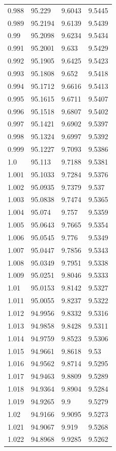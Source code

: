 \begin{tabular}{llll}
0.988 & 95.229 & 9.6043 & 9.5445 \\
0.989 & 95.2194 & 9.6139 & 9.5439 \\
0.99 & 95.2098 & 9.6234 & 9.5434 \\
0.991 & 95.2001 & 9.633 & 9.5429 \\
0.992 & 95.1905 & 9.6425 & 9.5423 \\
0.993 & 95.1808 & 9.652 & 9.5418 \\
0.994 & 95.1712 & 9.6616 & 9.5413 \\
0.995 & 95.1615 & 9.6711 & 9.5407 \\
0.996 & 95.1518 & 9.6807 & 9.5402 \\
0.997 & 95.1421 & 9.6902 & 9.5397 \\
0.998 & 95.1324 & 9.6997 & 9.5392 \\
0.999 & 95.1227 & 9.7093 & 9.5386 \\
1.0 & 95.113 & 9.7188 & 9.5381 \\
1.001 & 95.1033 & 9.7284 & 9.5376 \\
1.002 & 95.0935 & 9.7379 & 9.537 \\
1.003 & 95.0838 & 9.7474 & 9.5365 \\
1.004 & 95.074 & 9.757 & 9.5359 \\
1.005 & 95.0643 & 9.7665 & 9.5354 \\
1.006 & 95.0545 & 9.776 & 9.5349 \\
1.007 & 95.0447 & 9.7856 & 9.5343 \\
1.008 & 95.0349 & 9.7951 & 9.5338 \\
1.009 & 95.0251 & 9.8046 & 9.5333 \\
1.01 & 95.0153 & 9.8142 & 9.5327 \\
1.011 & 95.0055 & 9.8237 & 9.5322 \\
1.012 & 94.9956 & 9.8332 & 9.5316 \\
1.013 & 94.9858 & 9.8428 & 9.5311 \\
1.014 & 94.9759 & 9.8523 & 9.5306 \\
1.015 & 94.9661 & 9.8618 & 9.53 \\
1.016 & 94.9562 & 9.8714 & 9.5295 \\
1.017 & 94.9463 & 9.8809 & 9.5289 \\
1.018 & 94.9364 & 9.8904 & 9.5284 \\
1.019 & 94.9265 & 9.9 & 9.5279 \\
1.02 & 94.9166 & 9.9095 & 9.5273 \\
1.021 & 94.9067 & 9.919 & 9.5268 \\
1.022 & 94.8968 & 9.9285 & 9.5262 \\

\end{tabular}

